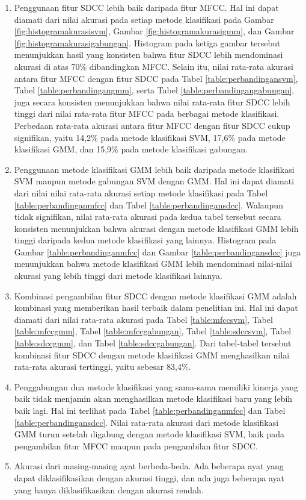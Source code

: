 \begin{enumerate}
  \item Penggunaan fitur SDCC lebih baik daripada fitur MFCC. Hal ini dapat diamati dari nilai akurasi pada setiap metode klasifikasi pada Gambar \ref{fig:histogramakurasisvm}, Gambar \ref{fig:histogramakurasigmm}, dan Gambar \ref{fig:histogramakurasigabungan}. Histogram pada ketiga gambar tersebut menunjukkan hasil yang konsisten bahwa fitur SDCC lebih mendominasi akurasi di atas 70\% dibandingkan MFCC. Selain itu, nilai rata-rata akurasi antara fitur MFCC dengan fitur SDCC pada Tabel \ref{table:perbandingansvm}, Tabel \ref{table:perbandingangmm}, serta Tabel \ref{table:perbandingangabungan}, juga secara konsisten menunjukkan bahwa nilai rata-rata fitur SDCC lebih tinggi dari nilai rata-rata fitur MFCC pada berbagai metode klasifikasi. Perbedaan rata-rata akurasi antara fitur MFCC dengan fitur SDCC cukup signifikan, yaitu 14,2\% pada metode klasifikasi SVM, 17,6\% pada metode klasifikasi GMM, dan 15,9\% pada metode klasifikasi gabungan.

  \item Penggunaan metode klasifikasi GMM lebih baik daripada metode klasifikasi SVM maupun metode gabungan SVM dengan GMM. Hal ini dapat diamati dari nilai nilai rata-rata akurasi setiap metode klasifikasi pada Tabel \ref{table:perbandinganmfcc} dan Tabel \ref{table:perbandingansdcc}. Walaupun tidak signifikan, nilai rata-rata akurasi pada kedua tabel tersebut secara konsisten menunjukkan bahwa akurasi dengan metode klasifikasi GMM lebih tinggi daripada kedua metode klasifikasi yang lainnya. Histogram pada Gambar \ref{table:perbandinganmfcc} dan Gambar \ref{table:perbandingansdcc} juga menunjukkan bahwa metode klasifikasi GMM lebih mendominasi nilai-nilai akurasi yang lebih tinggi dari metode klasifikasi lainnya.

  \item Kombinasi pengambilan fitur SDCC dengan metode klasifikasi GMM adalah kombinasi yang memberikan hasil terbaik dalam penelitian ini. Hal ini dapat diamati dari nilai rata-rata akurasi pada Tabel \ref{table:mfccsvm}, Tabel \ref{table:mfccgmm}, Tabel \ref{table:mfccgabungan}, Tabel \ref{table:sdccsvm}, Tabel \ref{table:sdccgmm}, dan Tabel \ref{table:sdccgabungan}. Dari tabel-tabel tersebut kombinasi fitur SDCC dengan metode klasifikasi GMM menghasilkan nilai rata-rata akurasi tertinggi, yaitu sebesar 83,4\%.

  \item Penggabungan dua metode klasifikasi yang sama-sama memiliki kinerja yang baik tidak menjamin akan menghasilkan metode klasifikasi baru yang lebih baik lagi. Hal ini terlihat pada Tabel \ref{table:perbandinganmfcc} dan Tabel \ref{table:perbandingansdcc}. Nilai rata-rata akurasi dari metode klasifikasi GMM turun setelah digabung dengan metode klasifikasi SVM, baik pada pengambilan fitur MFCC maupun pada pengambilan fitur SDCC.

  \item Akurasi dari masing-masing ayat berbeda-beda. Ada beberapa ayat yang dapat diklasifikasikan dengan akurasi tinggi, dan ada juga beberapa ayat yang hanya diklasifikasikan dengan akurasi rendah.
\end{enumerate}

